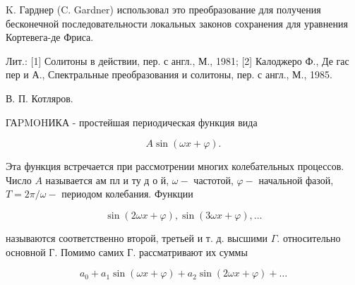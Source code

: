 \documentclass[10pt]{article}
\begin{document}
K. Гарднер (C. Gardner) использовал это преобразование для получения бесконечной последовательности локальных законов сохранения для уравнения Кортевега-де Фриса.



Лит.: [1] Солитоны в действии, пер. с англ., М., 1981; [2] Калоджеро Ф., Де гас пер и А., Спектральные преобразования и солитоны, пер. с англ., М., 1985.



В. П. Котляров.



ГАPMOHИКА - простейшая периодическая функция вида



\[

A \sin (\omega x+\varphi) .

\]



Эта функция встречается при рассмотрении многих колебательных процессов. Число $A$ называется ам пл и ту д о й, $\omega-$ частотой, $\varphi-$ начальной фазой, $T=2 \pi / \omega-$ периодом колебания. Функции



\[

\sin (2 \omega x+\varphi), \sin (3 \omega x+\varphi), \ldots

\]



называются соответственно второй, третьей и т. д. высшими $\Gamma$. относительно основной Г. Помимо самих Г. рассматривают их суммы



\[

a_{0}+a_{1} \sin (\omega x+\varphi)+a_{2} \sin (2 \omega x+\varphi)+\ldots

\]
\end{document}

